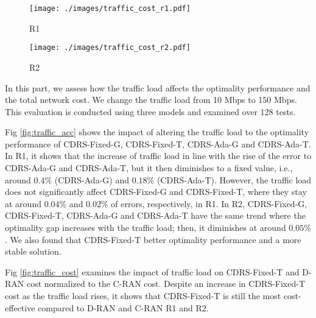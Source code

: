 \begin{figure*}[t] 
	\centering
	\begin{subfigure}[t]{.375\textwidth}
		\centering
		\texttt{[image: ./images/traffic\_cost\_r1.pdf]}
		\small\caption{\small R1}
	\end{subfigure}
	\begin{subfigure}[t]{.375\textwidth}
		\centering
		\texttt{[image: ./images/traffic\_cost\_r2.pdf]}
		\small\caption{\small R2}
	\end{subfigure}		
	\caption{\small \textbf{Impact of traffic load to total vRAN cost in (a) R1 and (b) R2.} On the comparison of our approach (e.g., CDRS-Fixed-T) to fully D-RAN. The presented cost above is normalized toward fully C-RAN cost.} \label{fig:traffic_cost}
	\vspace{-3mm}
\end{figure*}

In this part, we assess how the traffic load affects the optimality performance and the total network cost. We change the traffic load from 10 Mbps to 150 Mbps. This evaluation is conducted using three  models and examined over 128 tests.   

Fig \ref{fig:traffic_acc} shows the impact of altering the traffic load to the optimality performance of CDRS-Fixed-G, CDRS-Fixed-T, CDRS-Ada-G and CDRS-Ada-T. In R1, it shows that the increase of traffic load in line with the rise of the error to CDRS-Ada-G and CDRS-Ada-T, but it then diminishes to a fixed value, i.e., around $0.4 \%$ (CDRS-Ada-G) and $0.18\%$ (CDRS-Ada-T). However, the traffic load does not significantly affect CDRS-Fixed-G and CDRS-Fixed-T, where they stay at around $0.04\%$ and $0.02\%$ of errors, respectively, in R1. In R2, CDRS-Fixed-G, CDRS-Fixed-T, CDRS-Ada-G and CDRS-Ada-T have the same trend where the optimality gap increases with the traffic load; then, it diminishes at around  $0.05\%$. We also found that CDRS-Fixed-T  better optimality performance and a more stable solution. 


Fig \ref{fig:traffic_cost} examines the impact of traffic load on CDRS-Fixed-T and D-RAN cost normalized to the C-RAN cost. Despite an increase in CDRS-Fixed-T cost as the traffic load rises, it shows that CDRS-Fixed-T is still the most cost-effective compared to D-RAN and C-RAN  R1 and R2. 

